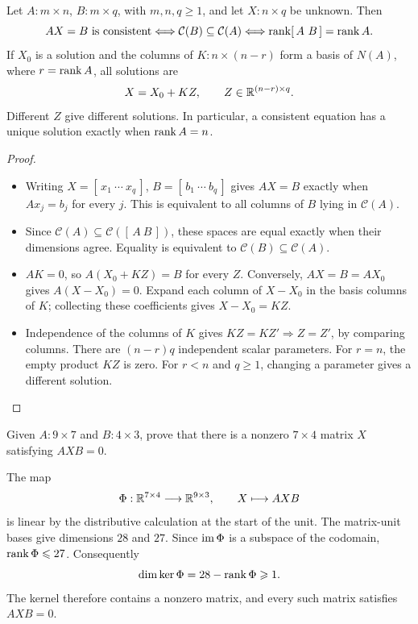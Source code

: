 \begin{theorem}\label{thm:04:matrix-equation}
Let \(A:m\times n\), \(B:m\times q\), with \(m,n,q\geqslant1\),
and let \(X:n\times q\) be unknown.
Then
\[
AX=B\text{ is consistent}
\Longleftrightarrow\mathcal C(B)\subseteq\mathcal C(A)
\Longleftrightarrow\operatorname{rank}[\,A\ B\,]=\operatorname{rank} A.
\]
If \(X_0\) is a solution and the columns of \(K:n\times(n-r)\)
form a basis of \(N(A)\), where \(r=\operatorname{rank} A\), all solutions are
\[
X=X_0+KZ,\qquad Z\in\mathbb R^{(n-r)\times q}.
\]
Different \(Z\) give different solutions. In particular, a consistent
equation has a unique solution exactly when \(\operatorname{rank} A=n\).
\end{theorem}
\begin{proof}
\begin{itemize}
\item Writing \(X=[\,x_1\ \cdots\ x_q\,]\), \(B=[\,b_1\ \cdots\ b_q\,]\)
  gives \(AX=B\) exactly when \(Ax_j=b_j\) for every \(j\).
  This is equivalent to all columns of \(B\) lying in \(\mathcal C(A)\).
\item Since \(\mathcal C(A)\subseteq\mathcal C([\,A\ B\,])\), these
  spaces are equal exactly when their dimensions agree.
  Equality is equivalent to \(\mathcal C(B)\subseteq\mathcal C(A)\).
\item \(AK=0\), so \(A(X_0+KZ)=B\) for every \(Z\).
  Conversely, \(AX=B=AX_0\) gives \(A(X-X_0)=0\).
  Expand each column of \(X-X_0\) in the basis columns of \(K\);
  collecting these coefficients gives \(X-X_0=KZ\).
\item Independence of the columns of \(K\) gives
  \(KZ=KZ'\Rightarrow Z=Z'\), by comparing columns.
  There are \((n-r)q\) independent scalar parameters.
  For \(r=n\), the empty product \(KZ\) is zero.
  For \(r<n\) and \(q\geqslant1\), changing a parameter gives a different solution.
\end{itemize}
\end{proof}

\begin{example}\label{example:04:matrix-kernel}
Given \(A:9\times7\) and \(B:4\times3\), prove that there is a nonzero
\(7\times4\) matrix \(X\) satisfying \(AXB=0\).
\par\smallskip
{}
The map
\[
\Phi:\mathbb R^{7\times4}\longrightarrow\mathbb R^{9\times3},\qquad X\longmapsto AXB
\]
is linear by the distributive calculation at the start of the unit.
The matrix-unit bases give dimensions \(28\) and \(27\). Since
\(\operatorname{im}\Phi\) is a subspace of the codomain, \(\operatorname{rank}\Phi\leqslant27\).
Consequently
\[
\dim\ker\Phi=28-\operatorname{rank}\Phi\geqslant1.
\]
The kernel therefore contains a nonzero matrix, and every such matrix
satisfies \(AXB=0\).
\end{example}
